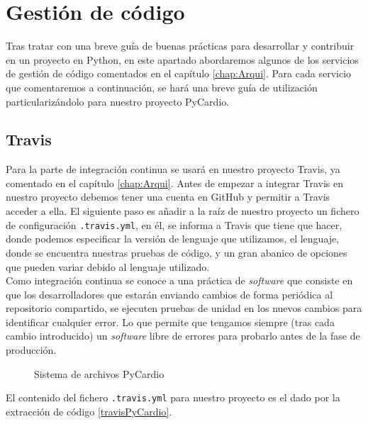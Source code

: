 \section{Gestión de código}
\label{subsec:}
Tras tratar con una breve guía de buenas prácticas para desarrollar y contribuir en un proyecto en Python, en este apartado abordaremos algunos de los servicios de gestión de código comentados en el capítulo \ref{chap:Arqui}. Para cada servicio que comentaremos a continuación, se hará una breve guía de utilización particularizándolo para nuestro proyecto PyCardio.

\subsection*{Travis}
\label{subsubsec:Travis}
Para la parte de integración continua se usará en nuestro proyecto Travis, ya comentado en el capítulo \ref{chap:Arqui}. Antes de empezar a integrar Travis en nuestro proyecto debemos tener una cuenta en GitHub y permitir a Travis acceder a ella. El siguiente paso es añadir a la raíz de nuestro proyecto un fichero de configuración \texttt{.travis.yml}, en él, se informa a Travis que tiene que hacer, donde podemos especificar la versión de lenguaje que utilizamos, el lenguaje, donde se encuentra nuestras pruebas de código, y un gran abanico de opciones que pueden variar debido al lenguaje utilizado. \\

Como integración continua se conoce a una práctica de \emph{software} que consiste en que los desarrolladores que estarán enviando cambios de forma periódica al repositorio compartido, se ejecuten pruebas de unidad en los nuevos cambios para identificar cualquier error. Lo que permite que tengamos siempre (tras cada cambio introducido) un \emph{software} libre de errores para probarlo antes de la fase de producción. \\

\begin{figure}[h!]
\centering
{}
\caption{Sistema de archivos PyCardio}
\label{fig:travisDir}
\end{figure}
El contenido del fichero \texttt{.travis.yml} para nuestro proyecto es el dado por la extracción de código \ref{travisPyCardio}. 

